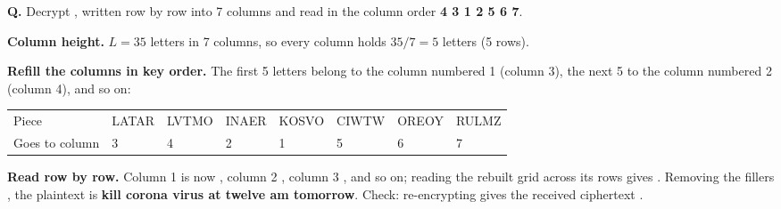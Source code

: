 \begin{worked}
\textbf{Q.} Decrypt , written row by row into 7 columns and read in the column order \textbf{4 3 1 2 5 6 7}.

\textbf{Column height.} $L = 35$ letters in 7 columns, so every column holds $35 / 7 = 5$ letters (5 rows).

\textbf{Refill the columns in key order.} The first 5 letters belong to the column numbered 1 (column 3), the next 5 to the column numbered 2 (column 4), and so on:
\begin{center}\small
\begin{tabular}{@{}llllllll@{}}
\toprule
Piece & LATAR & LVTMO & INAER & KOSVO & CIWTW & OREOY & RULMZ\\
Goes to column & 3 & 4 & 2 & 1 & 5 & 6 & 7\\
\bottomrule
\end{tabular}
\end{center}
\textbf{Read row by row.} Column 1 is now , column 2 , column 3 , and so on; reading the rebuilt grid across its rows gives . Removing the fillers , the plaintext is \textbf{kill corona virus at twelve am tomorrow}. Check: re-encrypting gives the received ciphertext \checkmark.
\end{worked}

